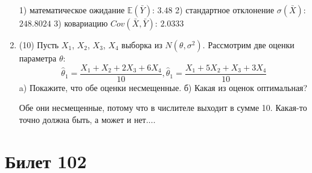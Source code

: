 \documentclass[a4paper,12pt]{article}
\begin{document}
\begin{enumerate}
1) математическое ожидание $\mathbb{E}(\bar Y)$: $3.48$ 
2) стандартное отклонение $\sigma(\bar X)$: $248.8024$
3) ковариацию $Cov(\bar X, \bar Y)$: $2.0333$


\item


(10) Пусть $X _{1}$, $X _{2}$, $X _{3}$, $X _{4}$ выборка из $N(\theta, \sigma ^{2})$. Рассмотрим две оценки параметра $\theta$:
\[\hat \theta _{1} = \frac{X _{1} + X _{2} + 2X _{3} + 6X _{4}}{10}, \hat \theta _{1} = \frac{X _{1} + 5X _{2} + X _{3} + 3X _{4}}{10}\]
a) Покажите, что обе оценки несмещенные.
б) Какая из оценок оптимальная?




Обе они несмещенные, потому что в числителе выходит в сумме 10.
Какая-то точно должна быть, а может и нет....



\end{enumerate}

\section{Билет 102}
\end{document}
